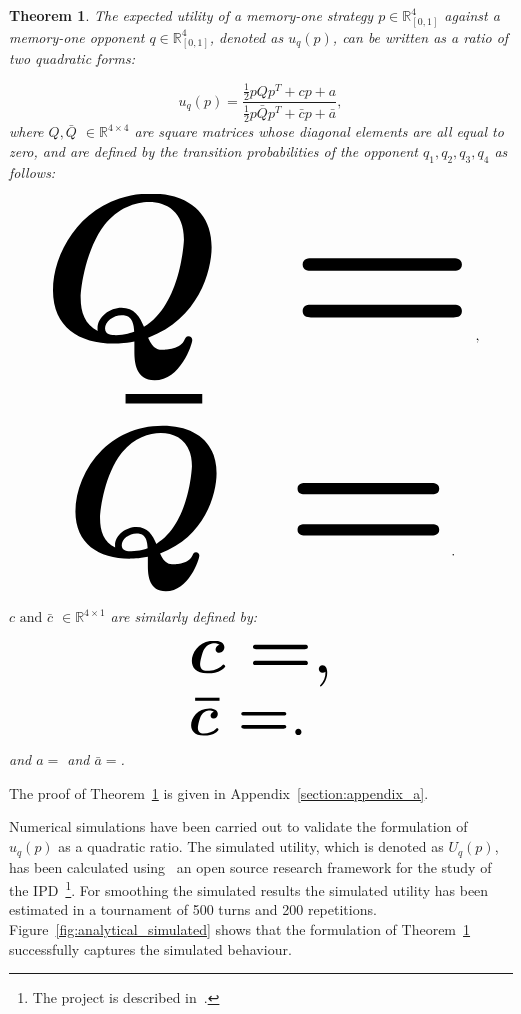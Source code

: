 \documentclass[10pt]{article}
\newcommand{\R}{\mathbb{R}}
\newtheorem{theorem}{Theorem}
\begin{document}
\begin{theorem}\label{theorem:quadratic_form_u}
    The expected utility of a memory-one strategy \(p\in\mathbb{R}_{[0,1]}^4\)
    against a memory-one opponent \(q\in\mathbb{R}_{[0,1]}^4\), denoted
    as \(u_q(p)\), can be written as a ratio of two quadratic forms:

    \begin{equation}\label{eq:optimisation_quadratic}
    u_q(p) = \frac{\frac{1}{2}pQp^T + cp + a}
                {\frac{1}{2}p\bar{Q}p^T + \bar{c}p + \bar{a}},
    \end{equation}
    where \(Q, \bar{Q}\) \(\in \R^{4\times4}\) are square matrices whose
    diagonal elements are all equal to zero, and are defined by the
    transition probabilities of the opponent \(q_1, q_2, q_3, q_4\) as follows:

    \begin{center}
    \begin{equation}
    \resizebox{0.9\linewidth}{!}{\arraycolsep=2.5pt%
    \boldmath\(
    Q = \)},
    \end{equation}
    \begin{equation}\label{eq:q_bar_matrix}
    \resizebox{0.8\linewidth}{!}{\arraycolsep=2.5pt%
    \boldmath\(
    \bar{Q} =  \)}.
    \end{equation}
    \end{center}

    \(c \text{ and } \bar{c}\) \(\in \R^{4 \times 1}\) are similarly defined by:

    \begin{equation}\label{eq:q_matrix_numerator}
    \resizebox{0.3\linewidth}{!}{\arraycolsep=2.5pt%
    \boldmath\(c = \),}
    \end{equation}
    \begin{equation}\label{eq:q_matrix_denominator}
    \resizebox{0.3\linewidth}{!}{\arraycolsep=2.5pt%
    \boldmath\(\bar{c} = \).
    }
    \end{equation}
    and \(a = \) and
    \(\bar{a} = \).
\end{theorem}

The proof of Theorem~\ref{theorem:quadratic_form_u} is given in Appendix~\ref{section:appendix_a}.

Numerical simulations have been carried out to validate the formulation of
\(u_q(p)\) as a quadratic ratio. The simulated utility, which is denoted as
\(U_q(p)\), has been calculated using~\cite{axelrodproject} an open source
research framework for the study of the IPD~\footnote{The project is described
in~\cite{Knight2016}.}. For smoothing the simulated results the
simulated utility has been estimated in a tournament of 500 turns and 200
repetitions. Figure~\ref{fig:analytical_simulated} shows that the formulation
of Theorem~\ref{theorem:quadratic_form_u} successfully
captures the simulated behaviour.
\end{document}
